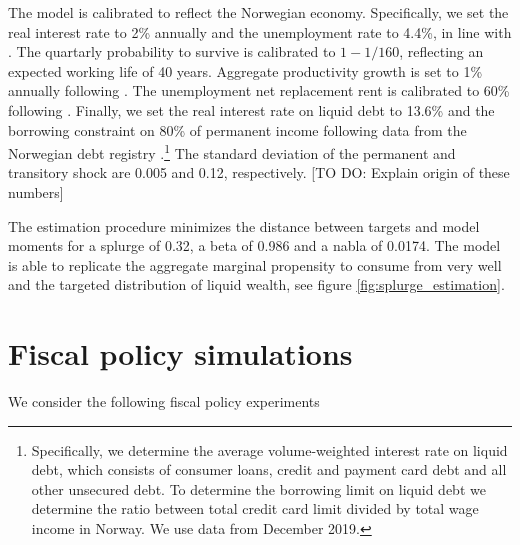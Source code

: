 \documentclass[11pt]{article}
\begin{document}
	The model is calibrated to reflect the Norwegian economy. Specifically, we set the real interest rate to 2\% annually and the unemployment rate to 4.4\%, in line with \citet{aursland_state-dependent_2020}. The quartarly probability to survive is calibrated to $1-1/160$, reflecting an expected working life of 40 years. Aggregate productivity growth is set to 1\% annually following \citet{kravik_navigating_2019}. The unemployment net replacement rent is calibrated to 60\% following \citet{oecd_net_2020}. Finally, we set the real interest rate on liquid debt to 13.6\% and the borrowing constraint on 80\% of permanent income following data from the Norwegian debt registry \citet{gjeldsregistret_nokkeltall_2022}.\footnote{Specifically, we determine the average volume-weighted interest rate on liquid debt, which consists of consumer loans, credit and payment card debt and all other unsecured debt. To determine the borrowing limit on liquid debt we determine the ratio between total credit card limit divided by total wage income in Norway. We use data from December 2019.} The standard deviation of the permanent and transitory shock are 0.005 and 0.12, respectively. [TO DO: Explain origin of these numbers]
	
	The estimation procedure minimizes the distance between targets and model moments for a splurge of 0.32, a beta of 0.986 and a nabla of 0.0174. The model is able to replicate the aggregate marginal propensity to consume from \citet{fagereng_mpc_2021} very well and the targeted distribution of liquid wealth, see figure \ref{fig:splurge_estimation}.


	
	\section{Fiscal policy simulations}
	
	We consider the following fiscal policy experiments
	
\end{document}
